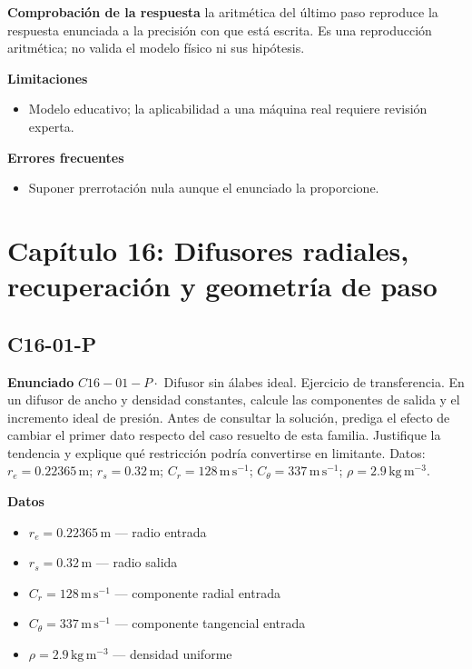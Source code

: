 \documentclass[10pt,openany]{book}
\begin{document}
\noindent\textbf{Comprobación de la respuesta} la aritmética del último paso reproduce la respuesta enunciada a la precisión con que está escrita. Es una reproducción aritmética; no valida el modelo físico ni sus hipótesis.

\noindent\textbf{Limitaciones}
\begin{itemize}
\item Modelo educativo; la aplicabilidad a una máquina real requiere revisión experta.
\end{itemize}

\noindent\textbf{Errores frecuentes}
\begin{itemize}
\item Suponer prerrotación nula aunque el enunciado la proporcione.
\end{itemize}
\section{Capítulo 16: Difusores radiales, recuperación y geometría de paso}
\subsection*{C16-01-P}

\noindent\textbf{Enunciado}
\(C16-01-P \cdot\) Difusor sin álabes ideal. Ejercicio de transferencia. En un difusor de ancho y densidad constantes, calcule las componentes de salida y el incremento ideal de presión. Antes de consultar la solución, prediga el efecto de cambiar el primer dato respecto del caso resuelto de esta familia. Justifique la tendencia y explique qué restricción podría convertirse en limitante. Datos: \(r_e=0.22365\, \mathrm{m}\); \(r_s=0.32\, \mathrm{m}\); \(C_r=128\, \mathrm{m}\,\mathrm{s}^{-1}\); \(C_\theta=337\, \mathrm{m}\,\mathrm{s}^{-1}\); \(\rho=2.9\, \mathrm{kg}\,\mathrm{m}^{-3}\).

\noindent\textbf{Datos}
\begin{itemize}
\item $r_e = 0.22365\,\mathrm{m}$ — radio entrada
\item $r_s = 0.32\,\mathrm{m}$ — radio salida
\item $C_r = 128\,\mathrm{m}\,\mathrm{s}^{-1}$ — componente radial entrada
\item $C_\theta = 337\,\mathrm{m}\,\mathrm{s}^{-1}$ — componente tangencial entrada
\item $\rho = 2.9\,\mathrm{kg}\,\mathrm{m}^{-3}$ — densidad uniforme
\end{itemize}
\end{document}
